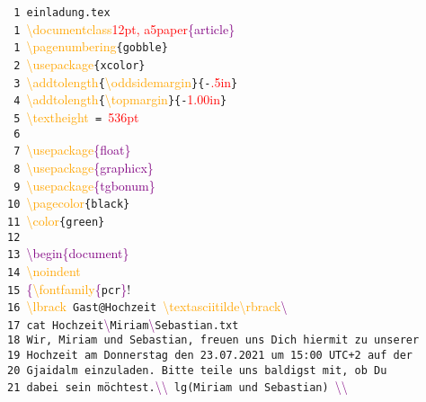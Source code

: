 \documentclass[12pt, a5paper]{article}
\newcommand{\red}[1]{\textcolor{red}{#1}}
\newcommand{\orange}[1]{\textcolor{orange}{#1}}
\newcommand{\purple}[1]{\textcolor{purple}{#1}}
\begin{document}
\noindent
{\selectfont
\verb! 1 einladung.tex!\\
 \verb! 1 !\orange{\textbackslash documentclass}\purple{\lbrack}\red{12pt, a5paper}\purple{\rbrack\{article\}}\\
 \verb! 1 !\orange{\textbackslash pagenumbering}\verb!{gobble}!\\
 \verb! 2 !\orange{\textbackslash usepackage}\verb!{xcolor}!\\
 \verb! 3 !\orange{\textbackslash addtolength}\verb!{!\orange{\textbackslash oddsidemargin}\verb!}{-!\red{.5in}\verb!}!\\
 \verb! 4 !\orange{\textbackslash addtolength}\verb!{!\orange{\textbackslash topmargin}\verb!}{-!\red{1.00in}\verb!}!\\
 \verb! 5 !\orange{\textbackslash textheight}\verb! = !\red{536pt}\\
 \verb! 6 !\\
 \verb! 7 !\orange{\textbackslash usepackage}\purple{\{float\}}\\
 \verb! 8 !\orange{\textbackslash usepackage}\purple{\{graphicx\}}\\
 \verb! 9 !\orange{\textbackslash usepackage}\purple{\{tgbonum\}}\\
 \verb!10 !\orange{\textbackslash pagecolor}\verb!{black}!\\
 \verb!11 !\orange{\textbackslash color}\verb!{green}!\\
 \verb!12 !\\
 \verb!13 !\purple{\textbackslash begin\{document\}}\\
 \verb!14 !\orange{\textbackslash noindent}\\
 \verb!15 !\purple{\{}\orange{\textbackslash fontfamily}\purple{\{}\verb!pcr!\purple{\}}\selectfont!\\
 \verb!16 !\orange{\textbackslash lbrack}\verb! Gast@Hochzeit !\orange{\textbackslash textasciitilde\textbackslash rbrack}\purple{\textbackslash\textdollar}\\
 \verb!17 cat Hochzeit!\purple{\textbackslash\textunderscore}\verb!Miriam!\purple{\textbackslash\textunderscore}\verb!Sebastian.txt!\\
 \verb!18 Wir, Miriam und Sebastian, freuen uns Dich hiermit zu unserer!\\
 \verb!19 Hochzeit am Donnerstag den 23.07.2021 um 15:00 UTC+2 auf der!\\
 \verb!20 Gjaidalm einzuladen. Bitte teile uns baldigst mit, ob Du!\\
 \verb!21 dabei sein möchtest.!\purple{\textbackslash\textbackslash}\verb! lg(Miriam und Sebastian) !\purple{\textbackslash\textbackslash}\\
}
\end{document}
